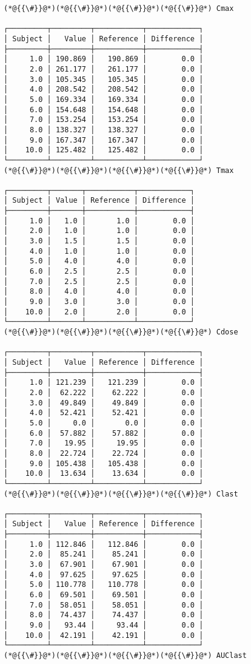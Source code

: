 \documentclass[12pt,a4paper]{article}
\begin{document}
\begin{lstlisting}
(*@{{\#}}@*)(*@{{\#}}@*)(*@{{\#}}@*)(*@{{\#}}@*) Cmax

┌─────────┬─────────┬───────────┬────────────┐
│ Subject │   Value │ Reference │ Difference │
├─────────┼─────────┼───────────┼────────────┤
│     1.0 │ 190.869 │   190.869 │        0.0 │
│     2.0 │ 261.177 │   261.177 │        0.0 │
│     3.0 │ 105.345 │   105.345 │        0.0 │
│     4.0 │ 208.542 │   208.542 │        0.0 │
│     5.0 │ 169.334 │   169.334 │        0.0 │
│     6.0 │ 154.648 │   154.648 │        0.0 │
│     7.0 │ 153.254 │   153.254 │        0.0 │
│     8.0 │ 138.327 │   138.327 │        0.0 │
│     9.0 │ 167.347 │   167.347 │        0.0 │
│    10.0 │ 125.482 │   125.482 │        0.0 │
└─────────┴─────────┴───────────┴────────────┘
(*@{{\#}}@*)(*@{{\#}}@*)(*@{{\#}}@*)(*@{{\#}}@*) Tmax

┌─────────┬───────┬───────────┬────────────┐
│ Subject │ Value │ Reference │ Difference │
├─────────┼───────┼───────────┼────────────┤
│     1.0 │   1.0 │       1.0 │        0.0 │
│     2.0 │   1.0 │       1.0 │        0.0 │
│     3.0 │   1.5 │       1.5 │        0.0 │
│     4.0 │   1.0 │       1.0 │        0.0 │
│     5.0 │   4.0 │       4.0 │        0.0 │
│     6.0 │   2.5 │       2.5 │        0.0 │
│     7.0 │   2.5 │       2.5 │        0.0 │
│     8.0 │   4.0 │       4.0 │        0.0 │
│     9.0 │   3.0 │       3.0 │        0.0 │
│    10.0 │   2.0 │       2.0 │        0.0 │
└─────────┴───────┴───────────┴────────────┘
(*@{{\#}}@*)(*@{{\#}}@*)(*@{{\#}}@*)(*@{{\#}}@*) Cdose

┌─────────┬─────────┬───────────┬────────────┐
│ Subject │   Value │ Reference │ Difference │
├─────────┼─────────┼───────────┼────────────┤
│     1.0 │ 121.239 │   121.239 │        0.0 │
│     2.0 │  62.222 │    62.222 │        0.0 │
│     3.0 │  49.849 │    49.849 │        0.0 │
│     4.0 │  52.421 │    52.421 │        0.0 │
│     5.0 │     0.0 │       0.0 │        0.0 │
│     6.0 │  57.882 │    57.882 │        0.0 │
│     7.0 │   19.95 │     19.95 │        0.0 │
│     8.0 │  22.724 │    22.724 │        0.0 │
│     9.0 │ 105.438 │   105.438 │        0.0 │
│    10.0 │  13.634 │    13.634 │        0.0 │
└─────────┴─────────┴───────────┴────────────┘
(*@{{\#}}@*)(*@{{\#}}@*)(*@{{\#}}@*)(*@{{\#}}@*) Clast

┌─────────┬─────────┬───────────┬────────────┐
│ Subject │   Value │ Reference │ Difference │
├─────────┼─────────┼───────────┼────────────┤
│     1.0 │ 112.846 │   112.846 │        0.0 │
│     2.0 │  85.241 │    85.241 │        0.0 │
│     3.0 │  67.901 │    67.901 │        0.0 │
│     4.0 │  97.625 │    97.625 │        0.0 │
│     5.0 │ 110.778 │   110.778 │        0.0 │
│     6.0 │  69.501 │    69.501 │        0.0 │
│     7.0 │  58.051 │    58.051 │        0.0 │
│     8.0 │  74.437 │    74.437 │        0.0 │
│     9.0 │   93.44 │     93.44 │        0.0 │
│    10.0 │  42.191 │    42.191 │        0.0 │
└─────────┴─────────┴───────────┴────────────┘
(*@{{\#}}@*)(*@{{\#}}@*)(*@{{\#}}@*)(*@{{\#}}@*) AUClast


\end{lstlisting}
\end{document}
